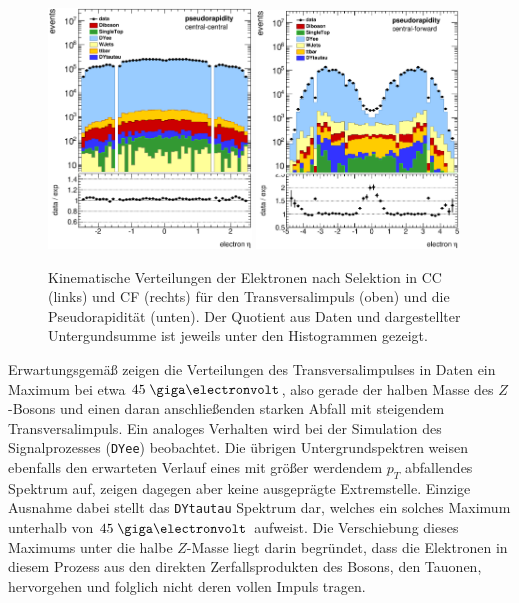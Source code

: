 \begin{figure}[hp]
    \includegraphics[width=0.48\textwidth]{plots/eta_cc}
    \hfill
    \includegraphics[width=0.48\textwidth]{plots/eta_cf}
    \caption[Kinematische Verteilungen der Elektronen nach Selektion in \ac{CC}
        und \ac{CF}]
        {Kinematische Verteilungen der Elektronen nach Selektion in \ac{CC}
        (links) und \ac{CF} (rechts) für den Transversalimpuls (oben) und die
        Pseudorapidität (unten). Der Quotient aus Daten und dargestellter
        Untergundsumme ist jeweils unter den Histogrammen gezeigt.}
    \label{fig:elec_kinematics}
\end{figure}

Erwartungsgemäß zeigen die Verteilungen des Transversalimpulses in Daten ein
Maximum bei etwa $45\GeV$, also gerade der halben Masse des $Z$-Bosons
und einen daran anschließenden starken Abfall mit steigendem Transversalimpuls.
Ein analoges Verhalten wird bei der Simulation des Signalprozesses
(\texttt{DYee}) beobachtet. Die übrigen Untergrundspektren weisen ebenfalls den
erwarteten Verlauf eines mit größer werdendem $p_T$ abfallendes Spektrum auf,
zeigen dagegen aber keine ausgeprägte Extremstelle. Einzige Ausnahme dabei
stellt das \texttt{DYtautau} Spektrum dar, welches ein solches Maximum
unterhalb von $45\GeV$ aufweist. Die Verschiebung dieses Maximums unter die
halbe $Z$-Masse liegt darin begründet, dass die Elektronen in diesem Prozess
aus den direkten Zerfallsprodukten des Bosons, den Tauonen, hervorgehen und
folglich nicht deren vollen Impuls tragen.

